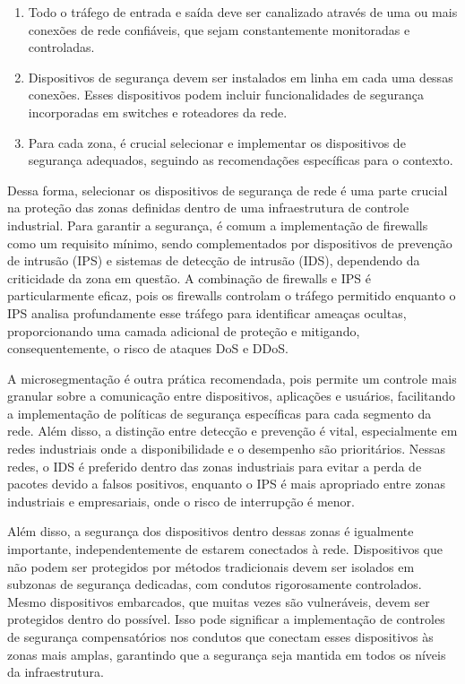         \begin{enumerate}
        \item Todo o tráfego de entrada e saída deve ser canalizado através de uma ou mais conexões de rede confiáveis, que sejam constantemente monitoradas e controladas.
        \item Dispositivos de segurança devem ser instalados em linha em cada uma dessas conexões. Esses dispositivos podem incluir funcionalidades de segurança incorporadas em switches e roteadores da rede.
        \item Para cada zona, é crucial selecionar e implementar os dispositivos de segurança adequados, seguindo as recomendações específicas para o contexto.
        \end{enumerate}

        Dessa forma, selecionar os dispositivos de segurança de rede é uma parte crucial na proteção das zonas definidas dentro de uma infraestrutura de controle industrial. Para garantir a segurança, é comum a implementação de firewalls como um requisito mínimo, sendo complementados por dispositivos de prevenção de intrusão (IPS) e sistemas de detecção de intrusão (IDS), dependendo da criticidade da zona em questão. A combinação de firewalls e IPS é particularmente eficaz, pois os firewalls controlam o tráfego permitido enquanto o IPS analisa profundamente esse tráfego para identificar ameaças ocultas, proporcionando uma camada adicional de proteção e mitigando, consequentemente, o risco de ataques DoS e DDoS.

        A microsegmentação é outra prática recomendada, pois permite um controle mais granular sobre a comunicação entre dispositivos, aplicações e usuários, facilitando a implementação de políticas de segurança específicas para cada segmento da rede. Além disso, a distinção entre detecção e prevenção é vital, especialmente em redes industriais onde a disponibilidade e o desempenho são prioritários. Nessas redes, o IDS é preferido dentro das zonas industriais para evitar a perda de pacotes devido a falsos positivos, enquanto o IPS é mais apropriado entre zonas industriais e empresariais, onde o risco de interrupção é menor.

        Além disso, a segurança dos dispositivos dentro dessas zonas é igualmente importante, independentemente de estarem conectados à rede. Dispositivos que não podem ser protegidos por métodos tradicionais devem ser isolados em subzonas de segurança dedicadas, com condutos rigorosamente controlados. Mesmo dispositivos embarcados, que muitas vezes são vulneráveis, devem ser protegidos dentro do possível. Isso pode significar a implementação de controles de segurança compensatórios nos condutos que conectam esses dispositivos às zonas mais amplas, garantindo que a segurança seja mantida em todos os níveis da infraestrutura.

